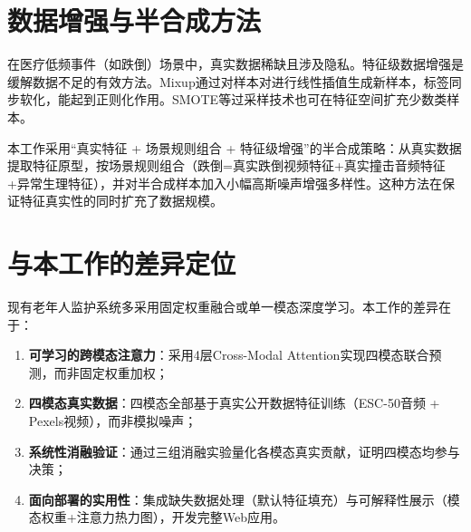 \section{数据增强与半合成方法}

在医疗低频事件（如跌倒）场景中，真实数据稀缺且涉及隐私。特征级数据增强是缓解数据不足的有效方法。Mixup\cite{zhang2018mixup}通过对样本对进行线性插值生成新样本，标签同步软化，能起到正则化作用。SMOTE等过采样技术也可在特征空间扩充少数类样本。

本工作采用``真实特征 + 场景规则组合 + 特征级增强''的半合成策略：从真实数据提取特征原型，按场景规则组合（跌倒=真实跌倒视频特征+真实撞击音频特征+异常生理特征），并对半合成样本加入小幅高斯噪声增强多样性。这种方法在保证特征真实性的同时扩充了数据规模。

\section{与本工作的差异定位}

现有老年人监护系统多采用固定权重融合或单一模态深度学习。本工作的差异在于：

\begin{enumerate}
    \item \textbf{可学习的跨模态注意力}：采用4层Cross-Modal Attention实现四模态联合预测，而非固定权重加权；
    \item \textbf{四模态真实数据}：四模态全部基于真实公开数据特征训练（ESC-50音频 + Pexels视频），而非模拟噪声；
    \item \textbf{系统性消融验证}：通过三组消融实验量化各模态真实贡献，证明四模态均参与决策；
    \item \textbf{面向部署的实用性}：集成缺失数据处理（默认特征填充）与可解释性展示（模态权重+注意力热力图），开发完整Web应用。
\end{enumerate}
